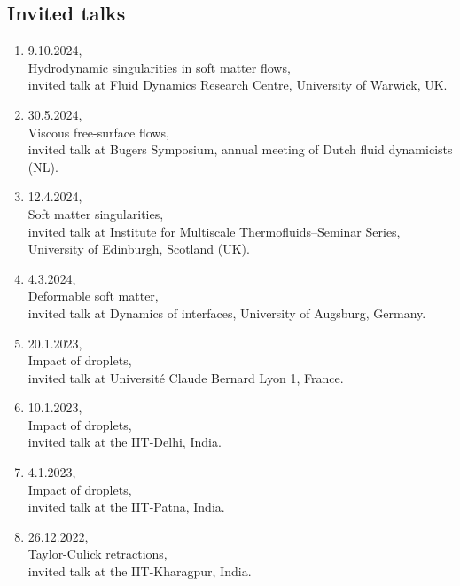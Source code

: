 \documentclass[11pt,a4paper,roman,english,colorlinks,linkcolor={red!50!black}]{moderncv}
\begin{document}
\subsection{\hspace*{-1.8cm}Invited talks}
\begin{enumerate}[leftmargin=0.75cm]
	\item 9.10.2024,\\
	Hydrodynamic singularities in soft matter flows,\\
	invited talk at Fluid Dynamics Research Centre, University of Warwick, UK.

	\item 30.5.2024,\\
	Viscous free-surface flows,\\
	invited talk at Bugers Symposium, annual meeting of Dutch fluid dynamicists (NL).

	\item 12.4.2024,\\
	Soft matter singularities,\\
	invited talk at Institute for Multiscale Thermofluids--Seminar Series, University of Edinburgh, Scotland (UK).

	\item 4.3.2024,\\
	Deformable soft matter,\\
	invited talk at Dynamics of interfaces, University of Augsburg, Germany.

	\item 20.1.2023,\\
	Impact of droplets,\\
	invited talk at Universit\'e Claude Bernard Lyon 1, France.

	\item 10.1.2023,\\
	Impact of droplets,\\
	invited talk at the IIT-Delhi, India.

	\item 4.1.2023,\\
	Impact of droplets,\\
	invited talk at the IIT-Patna, India.

	\item 26.12.2022,\\
	Taylor-Culick retractions,\\
	invited talk at the IIT-Kharagpur, India.



\end{enumerate}
\end{document}
